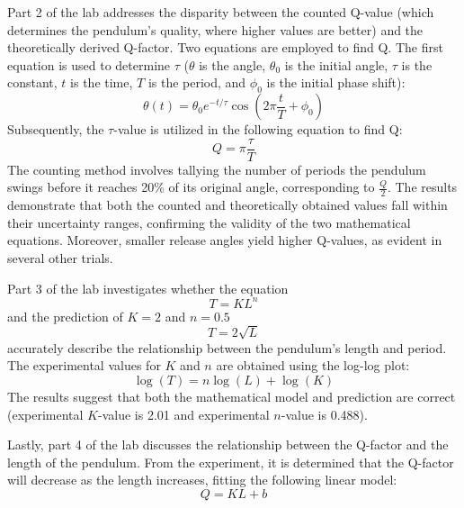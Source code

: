 \documentclass[11pt,titlepage,a4paper,twocolumn]{article}
\begin{document}
    Part 2 of the lab addresses the disparity between the counted Q-value (which determines the pendulum's quality, where higher values are better) and the theoretically derived Q-factor. Two equations are employed to find Q. The first equation is used to determine $\tau$ ($\theta$ is the angle, $\theta_0$ is the initial angle, $\tau$ is the constant, $t$ is the time, $T$ is the period, and $\phi_0$ is the initial phase shift):
    \begin{equation} 
    \theta(t) = \theta_0 e^{-t/\tau}\cos(2\pi \frac{t}{T}+\phi_0)
    \end{equation}
    Subsequently, the $\tau$-value is utilized in the following equation to find Q:
    \begin{equation} 
    Q = \pi \frac{\tau}{T}
    \end{equation}
    The counting method involves tallying the number of periods the pendulum swings before it reaches 20\% of its original angle, corresponding to $\frac{Q}{2}$. The results demonstrate that both the counted and theoretically obtained values fall within their uncertainty ranges, confirming the validity of the two mathematical equations. Moreover, smaller release angles yield higher Q-values, as evident in several other trials.
    
    Part 3 of the lab investigates whether the equation 
    \begin{equation}
    T = KL^n
    \end{equation}
    and the prediction of \(K = 2\) and \(n = 0.5\)
    \begin{equation}
    T = 2\sqrt{L}
    \end{equation}
    accurately describe the relationship between the pendulum's length and period. The experimental values for \(K\) and \(n\) are obtained using the log-log plot:
    \begin{equation}
    \log(T) = n\log(L) + \log(K)
    \end{equation}
    The results suggest that both the mathematical model and prediction are correct (experimental \(K\)-value is 2.01 and experimental \(n\)-value is 0.488).
    
    Lastly, part 4 of the lab discusses the relationship between the Q-factor and the length of the pendulum. From the experiment, it is determined that the Q-factor will decrease as the length increases, fitting the following linear model:
    \begin{equation}
    Q = KL + b
    \end{equation}
\end{document}

